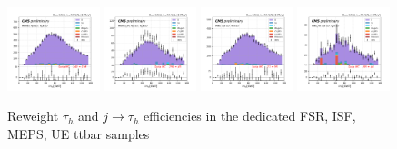 \begin{figure}
    
    \includegraphics[width=0.24\textwidth]{chapters/Appendix/sectionQCD/figures/mutau_>=2_>=2_dilepton_mass.png}
    \includegraphics[width=0.24\textwidth]{chapters/Appendix/sectionQCD/figures/mutau_ss_>=2_>=2_dilepton_mass.png}
    \includegraphics[width=0.24\textwidth]{chapters/Appendix/sectionQCD/figures/etau_>=2_>=2_dilepton_mass.png}
    \includegraphics[width=0.24\textwidth]{chapters/Appendix/sectionQCD/figures/etau_ss_>=2_>=2_dilepton_mass.png}
    
    

    \caption{Reweight $\tau_h$ and $j \to \tau_h$ efficiencies in the dedicated FSR, ISF, MEPS, UE ttbar samples}
    \label{fig:appendix:qcdsf:ltau}
\end{figure}



